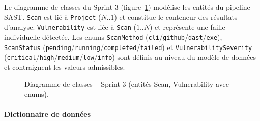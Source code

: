 Le diagramme de classes du Sprint 3 (figure~\ref{fig:sprint3-class}) modélise les entités du pipeline SAST. \texttt{Scan} est lié à \texttt{Project} (\(N..1\)) et constitue le conteneur des résultats d'analyse. \texttt{Vulnerability} est liée à \texttt{Scan} (\(1..N\)) et représente une faille individuelle détectée. Les enums \texttt{ScanMethod} (\texttt{cli}/\texttt{github}/\texttt{dast}/\texttt{exe}), \texttt{ScanStatus} (\texttt{pending}/\texttt{running}/\texttt{completed}/\texttt{failed}) et \texttt{VulnerabilitySeverity} (\texttt{critical}/\texttt{high}/\texttt{medium}/\texttt{low}/\texttt{info}) sont définis au niveau du modèle de données et contraignent les valeurs admissibles.

\begin{figure}[H]
\centering
\fbox{\rule{0pt}{2in}\rule{0.9\linewidth}{0pt}}
\caption{Diagramme de classes -- Sprint 3 (entités Scan, Vulnerability avec enums).}
\label{fig:sprint3-class}
\end{figure}

\paragraph{Dictionnaire de données}

